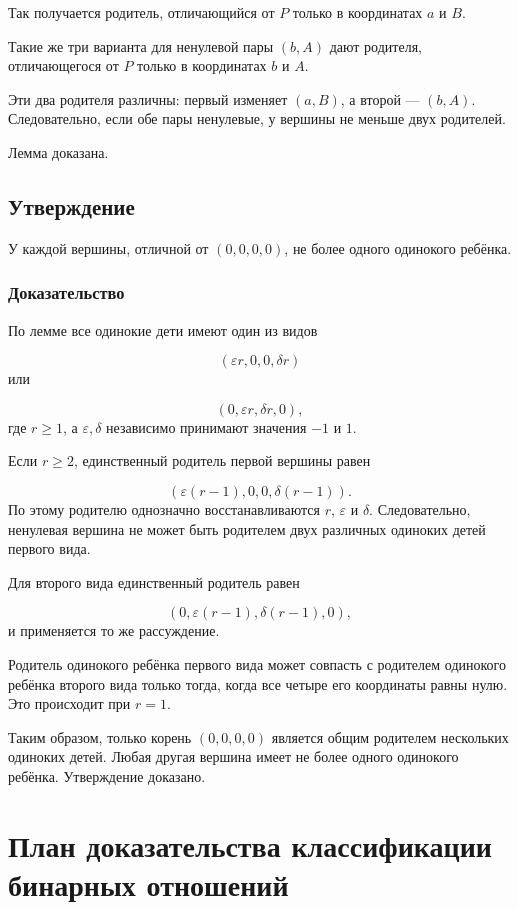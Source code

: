 Так получается родитель, отличающийся от $P$ только в координатах
$a$ и $B$.

Такие же три варианта для ненулевой пары $(b,A)$ дают родителя,
отличающегося от $P$ только в координатах $b$ и $A$.

Эти два родителя различны: первый изменяет $(a,B)$, а второй --- $(b,A)$.
Следовательно, если обе пары ненулевые, у вершины не меньше двух
родителей.

Лемма доказана.

\subsection{Утверждение}

У каждой вершины, отличной от $(0,0,0,0)$, не более одного одинокого
ребёнка.

\subsubsection{Доказательство}

По лемме все одинокие дети имеют один из видов

$$(\varepsilon r,0,0,\delta r)
$$
или

$$(0,\varepsilon r,\delta r,0),
$$
где $r\ge1$, а $\varepsilon,\delta$ независимо принимают значения $-1$ и $1$.

Если $r \ge 2$, единственный родитель первой вершины равен

$$(\varepsilon(r-1),0,0,\delta(r-1)).
$$
По этому родителю однозначно восстанавливаются $r$, $\varepsilon$ и $\delta$.
Следовательно, ненулевая вершина не может быть родителем двух различных
одиноких детей первого вида.

Для второго вида единственный родитель равен

$$(0,\varepsilon(r-1),\delta(r-1),0),
$$
и применяется то же рассуждение.

Родитель одинокого ребёнка первого вида может совпасть с родителем
одинокого ребёнка второго вида только тогда, когда все четыре его
координаты равны нулю. Это происходит при $r=1$.

Таким образом, только корень $(0,0,0,0)$ является общим родителем
нескольких одиноких детей. Любая другая вершина имеет не более одного
одинокого ребёнка. Утверждение доказано.

\section{План доказательства классификации бинарных отношений}

